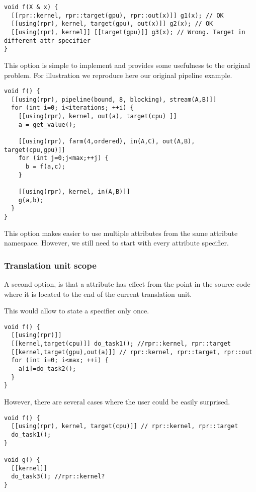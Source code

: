 \begin{lstlisting}
void f(X & x) {
  [[rpr::kernel, rpr::target(gpu), rpr::out(x)]] g1(x); // OK
  [[using(rpr), kernel, target(gpu), out(x)]] g2(x); // OK
  [[using(rpr), kernel]] [[target(gpu)]] g3(x); // Wrong. Target in different attr-specifier
}
\end{lstlisting}

This option is simple to implement and provides some usefulness to the original
problem. For illustration we reproduce here our original pipeline example.

\begin{lstlisting}
void f() {
  [[using(rpr), pipeline(bound, 8, blocking), stream(A,B)]]
  for (int i=0; i<iterations; ++i) {
    [[using(rpr), kernel, out(a), target(cpu) ]]
    a = get_value();
    
    [[using(rpr), farm(4,ordered), in(A,C), out(A,B), target(cpu,gpu)]]
    for (int j=0;j<max;++j) {
      b = f(a,c);
    }

    [[using(rpr), kernel, in(A,B)]]
    g(a,b);
  }
}
\end{lstlisting}

This option makes easier to use multiple attributes from the same attribute
namespace. However, we still need to start with  every attribute
specifier.

\subsubsection{Translation unit scope}

A second option, is that a  attribute has effect from the point
in the source code where it is located to the end of the current translation unit.

This would allow to state a  specifier only once.

\begin{lstlisting}
void f() {
  [[using(rpr)]]
  [[kernel,target(cpu)]] do_task1(); //rpr::kernel, rpr::target
  [[kernel,target(gpu),out(a)]] // rpr::kernel, rpr::target, rpr::out 
  for (int i=0; i<max; ++i) {
    a[i]=do_task2();
  }
}
\end{lstlisting}

However, there are several cases where the user could be easily surprised.

\begin{lstlisting}
void f() {
  [[using(rpr), kernel, target(cpu)]] // rpr::kernel, rpr::target
  do_task1();
}

void g() {
  [[kernel]]
  do_task3(); //rpr::kernel?
}
\end{lstlisting}

